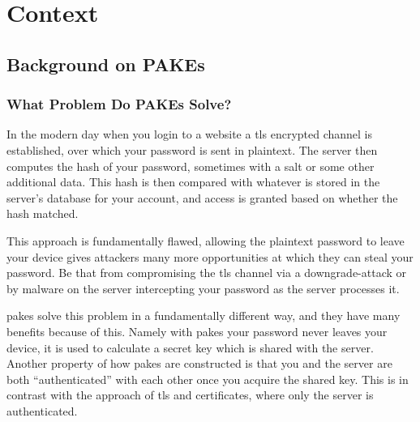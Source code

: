 \chapter{Context}
\label{chap:context}

\section{Background on PAKEs}
\subsection{What Problem Do PAKEs Solve?}
In the modern day when you login to a website a \gls{tls} encrypted channel is established, over which your password is sent in plaintext.
The server then computes the hash of your password, sometimes with a salt or some other additional data.
This hash is then compared with whatever is stored in the server's database for your account, and access is granted based on whether the hash matched.

This approach is fundamentally flawed, allowing the plaintext password to leave your device gives attackers many more opportunities at which they can steal your password.
Be that from compromising the \gls{tls} channel via a \gls{downgrade-attack} or by malware on the server intercepting your password as the server processes it.

\glspl{pake} solve this problem in a fundamentally different way, and they have many benefits because of this.
Namely with \glspl{pake} your password never leaves your device, it is used to calculate a secret key which is shared with the server.
Another property of how \glspl{pake} are constructed is that you and the server are both \enquote{authenticated} with each other once you acquire the shared key.
This is in contrast with the approach of \gls{tls} and certificates, where only the server is authenticated.

